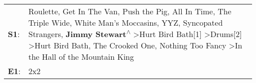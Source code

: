 \begin{supertabular}{p{0.03\textwidth}p{0.92\textwidth}}
 \textbf{S1}:  &  Roulette\textsuperscript{}, \enspace Get In The Van\textsuperscript{}, \enspace Push the Pig\textsuperscript{}, \enspace All In Time\textsuperscript{}, \enspace The Triple Wide\textsuperscript{}, \enspace White Man's Moccasins\textsuperscript{}, \enspace YYZ\textsuperscript{}, \enspace Syncopated Strangers\textsuperscript{}, \enspace \textbf{Jimmy Stewart\textsuperscript{$\wedge$}} \textgreater \enspace Hurt Bird Bath[1]\textsuperscript{} \textgreater \enspace Drums[2]\textsuperscript{} \textgreater \enspace Hurt Bird Bath\textsuperscript{}, \enspace The Crooked One\textsuperscript{}, \enspace Nothing Too Fancy\textsuperscript{} \textgreater \enspace In the Hall of the Mountain King\textsuperscript{}  \enspace  \\
 \textbf{E1}:  &                                                                                                                                                                                                                                                                                                                                                                                                                                                                                                                                                                                                                                                                                                                  2x2\textsuperscript{}  \enspace  \\
\end{supertabular}
